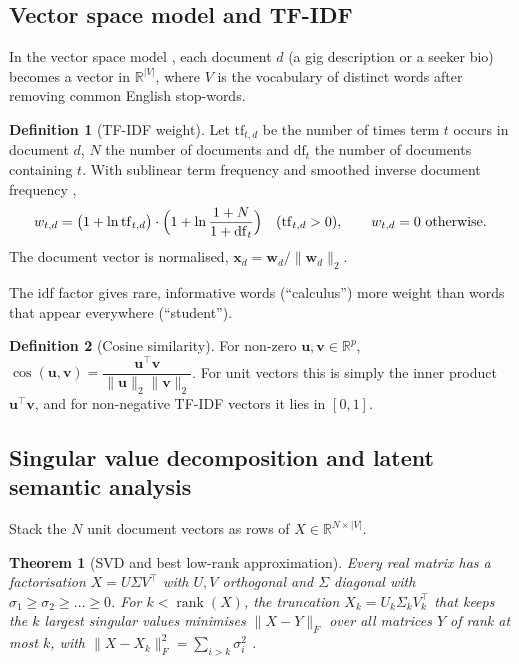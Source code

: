 \documentclass[12pt,a4paper]{article}
\numberwithin{equation}{section}
\theoremstyle{definition}
\newtheorem{definition}{Definition}[section]
\theoremstyle{plain}
\newtheorem{theorem}{Theorem}[section]
\newcommand{\R}{\mathbb{R}}
\begin{document}
\subsection{Vector space model and TF-IDF}
In the vector space model \citep{salton1975vector}, each document $d$ (a gig description or a seeker bio) becomes a vector in $\R^{|V|}$, where $V$ is the vocabulary of distinct words after removing common English stop-words.

\begin{definition}[TF-IDF weight]
Let $\mathrm{tf}_{t,d}$ be the number of times term $t$ occurs in document $d$, $N$ the number of documents and $\mathrm{df}_t$ the number of documents containing $t$. With sublinear term frequency and smoothed inverse document frequency \citep{salton1988term,manning2008introduction},
\begin{equation}
  w_{t,d} = \bigl(1+\ln \mathrm{tf}_{t,d}\bigr)\cdot\Bigl(1+\ln\frac{1+N}{1+\mathrm{df}_t}\Bigr) \quad (\mathrm{tf}_{t,d}>0), \qquad w_{t,d}=0 \text{ otherwise.}
  \label{eq:tfidf}
\end{equation}
The document vector is normalised, $\bm{x}_d = \bm{w}_d/\|\bm{w}_d\|_2$.
\end{definition}
The idf factor gives rare, informative words (\enquote{calculus}) more weight than words that appear everywhere (\enquote{student}).

\begin{definition}[Cosine similarity]
For non-zero $\bm{u},\bm{v}\in\R^p$, $\cos(\bm{u},\bm{v}) = \dfrac{\bm{u}^\top\bm{v}}{\|\bm{u}\|_2\|\bm{v}\|_2}$. For unit vectors this is simply the inner product $\bm{u}^\top\bm{v}$, and for non-negative TF-IDF vectors it lies in $[0,1]$.
\label{def:cos}
\end{definition}

\subsection{Singular value decomposition and latent semantic analysis}
Stack the $N$ unit document vectors as rows of $X\in\R^{N\times|V|}$.

\begin{theorem}[SVD and best low-rank approximation]
Every real matrix has a factorisation $X = U\Sigma V^\top$ with $U, V$ orthogonal and $\Sigma$ diagonal with $\sigma_1\ge\sigma_2\ge\dots\ge 0$. For $k<\operatorname{rank}(X)$, the truncation $X_k = U_k\Sigma_kV_k^\top$ that keeps the $k$ largest singular values minimises $\|X-Y\|_F$ over all matrices $Y$ of rank at most $k$, with $\|X-X_k\|_F^2=\sum_{i>k}\sigma_i^2$ \citep{eckart1936approximation}.
\end{theorem}
\end{document}
